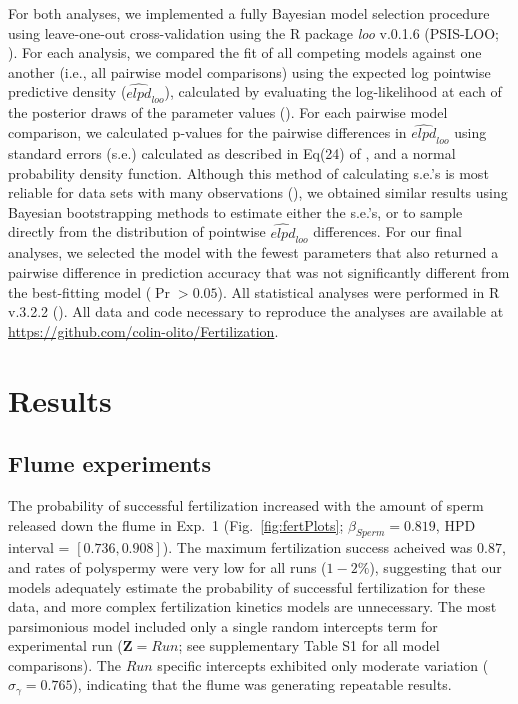 \documentclass{article}
\begin{document}
	For both analyses, we implemented a fully Bayesian model selection procedure using leave-one-out cross-validation using the R package \textit{loo} v.0.1.6 (PSIS-LOO; \citealt{Vehtari2016}). For each analysis, we compared the fit of all competing models against one another (i.e., all pairwise model comparisons) using the expected log pointwise predictive density ($\widehat{\textit{elpd}}_{\textit{loo}}$), calculated by evaluating the log-likelihood at each of the posterior draws of the parameter values (\citealt{HootenHobbs2015,Vehtari2016}). For each pairwise model comparison, we calculated p-values for the pairwise differences in $\widehat{\textit{elpd}}_{\textit{loo}}$ using standard errors (s.e.) calculated as described in Eq(24) of \citet{Vehtari2016}, and a normal probability density function. Although this method of calculating s.e.'s is most reliable for data sets with many observations (\citealt{Vehtari2016}), we obtained similar results using Bayesian bootstrapping methods to estimate either the s.e.'s, or to sample directly from the distribution of pointwise $\widehat{\textit{elpd}}_{\textit{loo}}$ differences. For our final analyses, we selected the model with the fewest parameters that also returned a pairwise difference in prediction accuracy that was not significantly different from the best-fitting model ($\Pr > 0.05$). All statistical analyses were performed in R v.3.2.2 (\citealt{R2016}). All data and code necessary to reproduce the analyses are available at \url{https://github.com/colin-olito/Fertilization}.

\section*{Results}

	\subsection*{Flume experiments}

	The probability of successful fertilization increased with the amount of sperm released down the flume in Exp.~1 (Fig.~\ref{fig:fertPlots}; $\beta_{Sperm} = 0.819$, HPD interval = $[0.736,0.908]$). The maximum fertilization success acheived was $0.87$, and rates of polyspermy were very low for all runs ($1-2\%$), suggesting that our models adequately estimate the probability of successful fertilization for these data, and more complex fertilization kinetics models are unnecessary. The most parsimonious model included only a single random intercepts term for experimental run ($\mathbf{Z} = Run$; see supplementary Table S1 for all model comparisons). The $Run$ specific intercepts exhibited only moderate variation ($\sigma_{\gamma} = 0.765$), indicating that the flume was generating repeatable results.
\end{document}
